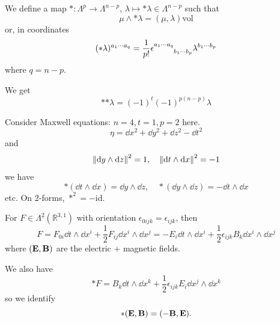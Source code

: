 \documentclass[a4paper,11pt]{article}
\begin{document}
    We define a map $*:\Lambda^p \to \Lambda^{n-p}$, $\lambda \mapsto *\lambda \in \Lambda^{n-p}$ such that 
    \begin{equation}
        \mu \wedge * \lambda = (\mu, \lambda) \text{vol}
    \end{equation}
    or, in coordinates 
    \begin{equation}
        (* \lambda)^{a_1\cdots a_q} = \frac{1}{p!} \epsilon\indices{^{a_1 \cdots a_q}_{b_1 \cdots b_p}} \lambda^{b_1 \cdots b_p}
    \end{equation}
    where $q = n-p$.

    We get 
    \begin{equation}
        *{*\lambda} = (-1)^t (-1)^{p(n-p)} \lambda
    \end{equation}

    \begin{ex}
        Consider Maxwell equations: $n=4,t=1,p=2$ here. 
        \begin{equation}
            \eta = \dd{x^2} + \dd{y^2} + \dd{z^2} - \dd{t^2}
        \end{equation}
        and 
        \begin{equation}
            \norm{\dd{y}\wedge \dd{z}}^2 = 1, \quad \norm{\dd{t}\wedge \dd{x}}^2 = -1
        \end{equation}
        we have 
        \begin{equation}
            *(\dd{t}\wedge \dd{x}) = \dd y \wedge \dd z, \quad *(\dd y \wedge \dd z) = - \dd t \wedge \dd x
        \end{equation}
        etc. On $2$-forms, $*^2 = - \text{id}$. 

        For $F \in \Lambda^2(\mathbb{R}^{3,1})$ with orientation $\epsilon_{0ijk} = \epsilon_{ijk}$, then 
        \begin{equation}
            F = F_{0i} \dd {t} \wedge \dd {x^i} + \frac{1}{2} F_{ij} \dd {x^i} \wedge \dd {x^j} = - E_i \dd{t} \wedge \dd{x^i} + \frac{1}{2} \epsilon_{ijk} B_k \dd{x^i} \wedge \dd{x^j}
        \end{equation}
        where $(\vb E, \vb B)$ are the electric + magnetic fields. 
        
        We also have 
        \begin{equation}
            * F = B_k \dd{t}\wedge \dd{x^k} + \frac{1}{2} \epsilon_{ijk} E_i \dd{x^j} \wedge \dd{x^k}
        \end{equation}
        so we identify 
        \begin{equation}
            *(\vb E, \vb B) = (- \vb B, \vb E).
        \end{equation}


\end{ex}
\end{document}
